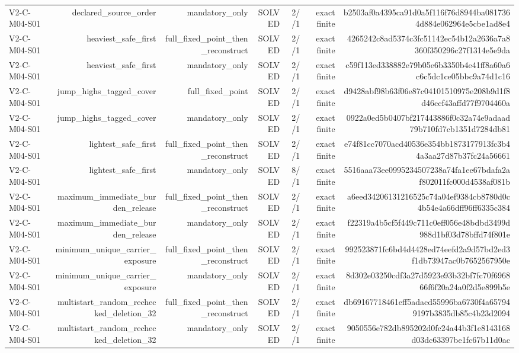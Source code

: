 {\begin{longtable}{lrrrrrr}
V2-C-M04-S01 & declared\_source\_order & mandatory\_only & SOLVED & 2//1 & exact finite & b2503af0a4395ca91d0a5f116f76d8944ba0817364d884e062964e5cbe1ad8e4 \\
V2-C-M04-S01 & heaviest\_safe\_first & full\_fixed\_point\_then\_reconstruct & SOLVED & 2//1 & exact finite & 4265242c8ad5374c3fc51142ec54b12a2636a7a8360f350296c27f1314e5e9da \\
V2-C-M04-S01 & heaviest\_safe\_first & mandatory\_only & SOLVED & 2//1 & exact finite & c59f113ed338882e79b05e6b3350b4e41ff8a60a6c6c5dc1ce05bbc9a74d1c16 \\
V2-C-M04-S01 & jump\_highs\_tagged\_cover & full\_fixed\_point & SOLVED & 2//1 & exact finite & d9428abf98b63f06e87c04101510975e208b9d1f8d46ccf43affd77f9704460a \\
V2-C-M04-S01 & jump\_highs\_tagged\_cover & mandatory\_only & SOLVED & 2//1 & exact finite & 0922a0ed5b0407bf217443886f0c32a74e9adaad79b710fd7cb1351d7284db81 \\
V2-C-M04-S01 & lightest\_safe\_first & full\_fixed\_point\_then\_reconstruct & SOLVED & 2//1 & exact finite & e74f81cc7070acd40536e354bb1873177913fc3b44a3aa27d87b37fc24a56661 \\
V2-C-M04-S01 & lightest\_safe\_first & mandatory\_only & SOLVED & 8//1 & exact finite & 5516aaa73ee0995234507238a74fa1ee67bdafa2af802011fc000d4538af081b \\
V2-C-M04-S01 & maximum\_immediate\_burden\_release & full\_fixed\_point\_then\_reconstruct & SOLVED & 2//1 & exact finite & a6eed34206131216525c74a04ef9384cb8780d0c4b54e4a66dff96ff6335c384 \\
V2-C-M04-S01 & maximum\_immediate\_burden\_release & mandatory\_only & SOLVED & 2//1 & exact finite & f22319a4b5cf5f449c711c0eff056e48bdbd3499d988d1bf03d78bffd74f801e \\
V2-C-M04-S01 & minimum\_unique\_carrier\_exposure & full\_fixed\_point\_then\_reconstruct & SOLVED & 2//1 & exact finite & 992523871fc6bd4d4428ed74eefd2a9d57bd2ed3f1db73947ac0b7652567950e \\
V2-C-M04-S01 & minimum\_unique\_carrier\_exposure & mandatory\_only & SOLVED & 2//1 & exact finite & 8d302e03250cdf3a27d5923e93b32bf7fc70f696866f6f20a24a0f2d5e899b5e \\
V2-C-M04-S01 & multistart\_random\_rechecked\_deletion\_32 & full\_fixed\_point\_then\_reconstruct & SOLVED & 2//1 & exact finite & db69167718461eff5adacd55996ba6730f4a657949197b3835db85c4b23d2094 \\
V2-C-M04-S01 & multistart\_random\_rechecked\_deletion\_32 & mandatory\_only & SOLVED & 2//1 & exact finite & 9050556e782db895202d0fc24a44b3f1e8143168d03dc63397be1fc67b11d0ac \\

\end{longtable}}
